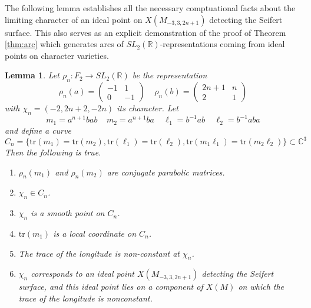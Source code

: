 \documentclass{article}
\theoremstyle{plain}
\theoremstyle{definition}
\theoremstyle{plain}
\theoremstyle{plain}
\theoremstyle{plain}
\newtheorem{lemma}[theorem]{Lemma}
\theoremstyle{remark}
\theoremstyle{remark}
\theoremstyle{plain}
\newtheorem{conjecture}[theorem]{Conjecture}
\theoremstyle{plain}
\begin{document}

The following lemma establishes all the necessary comptuational facts about the limiting character of an ideal point on $X(M_{-3, 3, 2n+1})$ detecting the Seifert surface. This also serves as an explicit demonstration of the proof of Theorem \ref{thm:arc} which generates arcs of $SL_2(\mathbb{R})$-representations coming from ideal points on character varieties.

\begin{lemma}\label{lma:limiting}
Let $\rho_n: F_2 \to SL_2(\mathbb{R})$ be the representation 
\begin{equation}
	\rho_n(a) = \begin{pmatrix}-1 & 1 \\ 0 & -1\end{pmatrix} \ \ \ \ \ \rho_n(b) = \begin{pmatrix}2n+1 & n \\ 2 & 1\end{pmatrix}
\end{equation}
with $\chi_n = (-2, 2n+2, -2n)$ its character. Let 
\begin{equation}
	m_1 = a^{n+1}bab \ \ \ \ \ m_2 = a^{n+1}ba \ \ \ \ \ \ell_1 = b^{-1}ab \ \ \ \ \ \ell_2 = b^{-1}aba
\end{equation}
and define a curve
\begin{equation}
	C_n = \{\text{tr}(m_1) = \text{tr}(m_2), \text{tr}(\ell_1) = \text{tr}(\ell_2), \text{tr}(m_1\ell_1) = \text{tr}(m_2\ell_2)\} \subset \mathbb{C}^3
\end{equation}
Then the following is true.
\begin{enumerate}
	\item $\rho_n(m_1)$ and $\rho_n(m_2)$ are conjugate parabolic matrices.
	\item $\chi_n \in C_n$. 
	\item $\chi_n$ is a smooth point on $C_n$.
	\item $\text{tr}(m_1)$ is a local coordinate on $C_n$.
	\item The trace of the longitude is non-constant at $\chi_n$.
	\item $\chi_n$ corresponds to an ideal point $X(M_{-3, 3, 2n+1})$ detecting the Seifert surface, and this ideal point lies on a component of $X(M)$ on which the trace of the longitude is nonconstant.
\end{enumerate}
\end{lemma}
\end{document}
